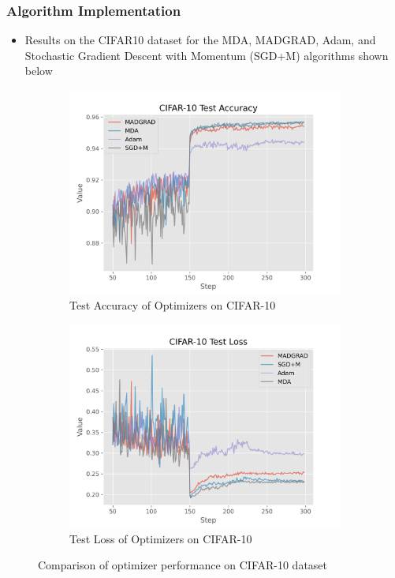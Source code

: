 \documentclass{beamer}
\begin{document}
\begin{frame}
  \frametitle{Algorithm Implementation}
  \begin{itemize}
    \item Results on the CIFAR10 dataset for the MDA, MADGRAD, Adam, and Stochastic
      Gradient Descent with Momentum (SGD+M) algorithms shown below
  \end{itemize}

\begin{figure}[H]
  \centering
  \begin{subfigure}{.5\textwidth}
    \centering
    \includegraphics[width=\linewidth]{../ftrl_dl_data/CIFAR-10_test_acc_closeup.png}
    \caption{Test Accuracy of Optimizers on CIFAR-10}
    \label{fig:sub1}
  \end{subfigure}%
  \begin{subfigure}{.5\textwidth}
    \centering
    \includegraphics[width=\linewidth]{../ftrl_dl_data/CIFAR-10_test_loss_closeup.png}
    \caption{Test Loss of Optimizers on CIFAR-10}
    \label{fig:sub2}
  \end{subfigure}
  \caption{Comparison of optimizer performance on CIFAR-10 dataset}
  \label{fig:test}
\end{figure}
\end{frame}
\end{document}
